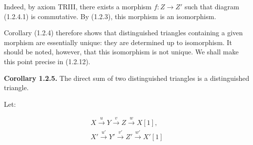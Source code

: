 Indeed, by axiom TRIII, there exists a morphism
$f\colon Z\longrightarrow Z'$ such that diagram (1.2.4.1) is commutative.
By (1.2.3), this morphism is an isomorphism.

Corollary (1.2.4) therefore shows that distinguished triangles containing a
given morphism are essentially unique: they are determined up to
isomorphism. It should be noted, however, that this isomorphism is not
unique. We shall make this point precise in (1.2.12).

\medskip
\noindent\textbf{Corollary 1.2.5.}\quad
The direct sum of two distinguished triangles is a distinguished triangle.

Let:

\[
  \begin{gathered}
    X\xrightarrow{u}Y\xrightarrow{v}Z\xrightarrow{w}X[1],\\
    X'\xrightarrow{u'}Y'\xrightarrow{v'}Z'\xrightarrow{w'}X'[1]
  \end{gathered}
\]
\endgroup
